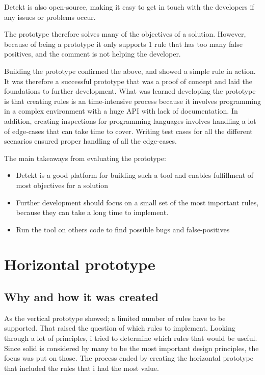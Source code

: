 \documentclass{report}
\begin{document}
Detekt is also open-source, making it easy to get in touch with the developers if any issues or problems occur.


The prototype therefore solves many of the objectives of a solution. However, because of being a prototype it only supports 1 rule that has too many false positives, and the comment is not helping the developer.


Building the prototype confirmed the above, and showed a simple rule in action. It was therefore a successful prototype that was a proof of concept and laid the foundations to further development. What was learned developing the prototype is that creating rules is an time-intensive process because it involves programming in a complex environment with a huge API with lack of documentation. In addition, creating inspections for programming languages involves handling a lot of edge-cases that can take time to cover. Writing test cases for all the different scenarios ensured proper handling of all the edge-cases.


The main takeaways from evaluating the prototype:
\begin{itemize}
    \item Detekt is a good platform for building such a tool and enables fulfillment of most objectives for a solution
    \item Further development should focus on a small set of the most important rules, because they can take a long time to implement.
    \item Run the tool on others code to find possible bugs and false-positives
\end{itemize}

\section{Horizontal prototype}
\subsection*{Why and how it was created}
As the vertical prototype showed; a limited number of rules have to be supported. That raised the question of which rules to implement. Looking through a lot of principles, i tried to determine which rules that would be useful. Since \gls{solid} is considered by many to be the most important design principles, the focus was put on those. The process ended by creating the horizontal prototype that included the rules that i had the most value. 
\end{document}

